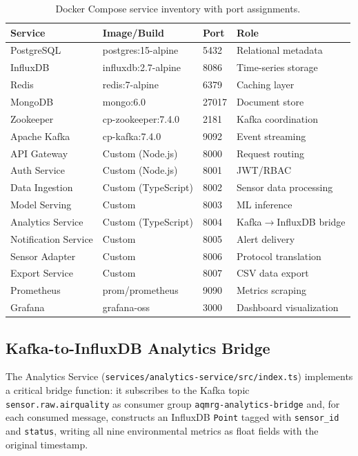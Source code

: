 \documentclass[12pt,a4paper]{article}
\begin{document}
\begin{table}[H]
\centering
\caption{Docker Compose service inventory with port assignments.}
\label{tab:docker}
\begin{tabular}{@{}llll@{}}
\toprule
\textbf{Service} & \textbf{Image/Build} & \textbf{Port} & \textbf{Role} \\
\midrule
PostgreSQL & postgres:15-alpine & 5432 & Relational metadata \\
InfluxDB & influxdb:2.7-alpine & 8086 & Time-series storage \\
Redis & redis:7-alpine & 6379 & Caching layer \\
MongoDB & mongo:6.0 & 27017 & Document store \\
Zookeeper & cp-zookeeper:7.4.0 & 2181 & Kafka coordination \\
Apache Kafka & cp-kafka:7.4.0 & 9092 & Event streaming \\
API Gateway & Custom (Node.js) & 8000 & Request routing \\
Auth Service & Custom (Node.js) & 8001 & JWT/RBAC \\
Data Ingestion & Custom (TypeScript) & 8002 & Sensor data processing \\
Model Serving & Custom & 8003 & ML inference \\
Analytics Service & Custom (TypeScript) & 8004 & Kafka$\rightarrow$InfluxDB bridge \\
Notification Service & Custom & 8005 & Alert delivery \\
Sensor Adapter & Custom & 8006 & Protocol translation \\
Export Service & Custom & 8007 & CSV data export \\
Prometheus & prom/prometheus & 9090 & Metrics scraping \\
Grafana & grafana-oss & 3000 & Dashboard visualization \\
\bottomrule
\end{tabular}
\end{table}

\subsection{Kafka-to-InfluxDB Analytics Bridge}
The Analytics Service (\texttt{services/analytics-service/src/index.ts}) implements a critical bridge function: it subscribes to the Kafka topic \texttt{sensor.raw.airquality} as consumer group \texttt{aqmrg-analytics-bridge} and, for each consumed message, constructs an InfluxDB \texttt{Point} tagged with \texttt{sensor\_id} and \texttt{status}, writing all nine environmental metrics as float fields with the original timestamp.
\end{document}
